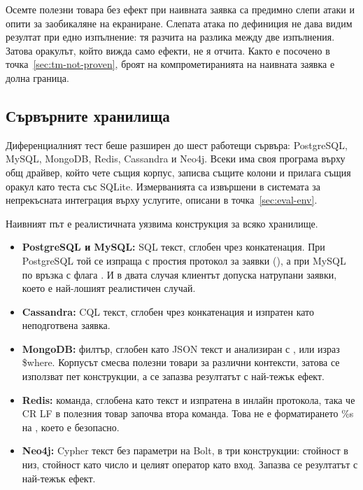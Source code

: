 Осемте полезни товара без ефект при наивната заявка са предимно слепи атаки и
опити за заобикаляне на екраниране. Слепата атака по дефиниция не дава видим
резултат при едно изпълнение: тя разчита на разлика между две изпълнения. Затова
оракулът, който вижда само ефекти, не я отчита. Както е посочено в
точка~\ref{sec:tm-not-proven}, броят на компрометиранията на наивната заявка е
долна граница.

\subsection{Сървърните хранилища}
\label{sec:eval-servers}

Диференциалният тест беше разширен до шест работещи сървъра: PostgreSQL, MySQL,
MongoDB, Redis, Cassandra и Neo4j. Всеки има своя програма върху общ драйвер, който чете същия
корпус, записва същите колони и прилага същия оракул като теста със SQLite.
Измерванията са извършени в системата за непрекъсната интеграция върху услугите,
описани в точка~\ref{sec:eval-env}.

Наивният път е реалистичната уязвима конструкция за всяко хранилище.

\begin{itemize}
    \item \textbf{PostgreSQL и MySQL:} SQL текст, сглобен чрез конкатенация. При
          PostgreSQL той се изпраща с простия протокол за заявки
          (), а при MySQL по връзка с флага
          . И в двата случая клиентът допуска
          натрупани заявки, което е най-лошият реалистичен случай.
    \item \textbf{Cassandra:} CQL текст, сглобен чрез конкатенация и изпратен като
          неподготвена заявка.
    \item \textbf{MongoDB:} филтър, сглобен като JSON текст и анализиран с
          , или израз {\ttfamily \$where}. Корпусът смесва
          полезни товари за различни контексти, затова се използват пет
          конструкции, а се запазва резултатът с най-тежък ефект.
    \item \textbf{Redis:} команда, сглобена като текст и изпратена в
          инлайн протокола, така че CR LF в полезния товар започва втора команда.
          Това не е форматирането {\ttfamily \%s} на , което е безопасно.
    \item \textbf{Neo4j:} Cypher текст без параметри на Bolt, в три конструкции:
          стойност в низ, стойност като число и целият оператор като вход. Запазва
          се резултатът с най-тежък ефект.
\end{itemize}

